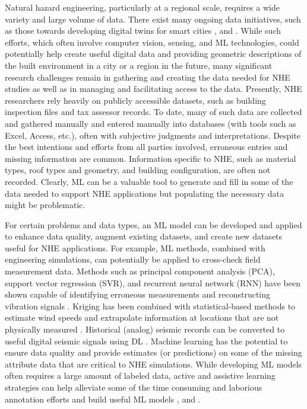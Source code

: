 Natural hazard engineering, particularly at a regional scale, requires a wide variety and large volume of data. There exist many ongoing data initiatives, such as those towards developing digital twins for smart cities \citep{nic2017, lehner2020digital, schrotter2020digital}, and \citep{day2019bentley}. While such efforts, which often involve computer vision, sensing, and ML technologies, could potentially help create useful digital data and providing geometric descriptions of the built environment in a city or a region in the future, many significant research challenges remain in gathering and creating the data needed for NHE studies as well as in managing and facilitating access to the data. Presently, NHE researchers rely heavily on publicly accessible datasets, such as building inspection files and tax assessor records. To date, many of such data are collected and gathered manually and entered manually into databases (with tools such as Excel, Access, etc.), often with subjective judgments and interpretations. Despite the best intentions and efforts from all parties involved, erroneous entries and missing information are common. Information specific to NHE, such as material types, roof types and geometry, and building configuration, are often not recorded. Clearly, ML can be a valuable tool to generate and fill in some of the data needed to support NHE applications but populating the necessary data might be problematic. 

For certain problems and data types, an ML model can be developed and applied to enhance data quality, augment existing datasets, and create new datasets useful for NHE applications. For example, ML methods, combined with engineering simulations, can potentially be applied to cross-check field measurement data. Methods such as principal component analysis (PCA), support vector regression (SVR), and recurrent neural network (RNN) have been shown capable of identifying erroneous measurements and reconstructing vibration signals \citep{kerschen2005sensor,jeong2019sensor}. Kriging has been combined with statistical-based methods to estimate wind speeds and extrapolate information at locations that are not physically measured \citep{xu2014conditional}. Historical (analog) seismic records can be converted to useful digital seismic signals using DL \citep{wang2019seismology}. Machine learning has the potential to ensure data quality and provide estimates (or predictions) on some of the missing attribute data that are critical to NHE simulations. While developing ML models often requires a large amount of labeled data, active and assistive learning strategies can help alleviate some of the time consuming and laborious annotation efforts and build useful ML models \citep{joshi2009multiclass,wong2019assistive}, and \citep{yu2020largescale}. 

